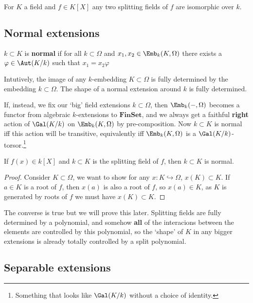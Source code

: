 \documentclass{article}
\begin{document}
\begin{corollary}
    For $K$ a field and $f\in K[X]$ any two splitting fields of $f$ are isomorphic over $k$.
\end{corollary}

\subsection{Normal extensions}

\begin{definition}
    $k\subset K$ is \textbf{normal} if for all $k\subset \Omega$ and $x_1,x_2\in\Emb_k(K,\Omega)$ there exists a $\varphi \in \Aut(K/k)$ such that $x_1=x_2\varphi$
\end{definition}

Intutively, the image of any $k$-embedding $K\subset \Omega$ is fully determined by the embedding $k\subset \Omega$. The shape of a normal extension around $k$ is fully determined.

If, instead, we fix our `big' field extensions $k\subset \Omega$, then $\Emb_k(-,\Omega)$ becomes a functor from algebraic $k$-extensions to $\textbf{FinSet}$, and we always get a faithful \textbf{right} action of $\Gal(K/k)$ on $\Emb_k(K,\Omega)$ by pre-composition. Now $k\subset K$ is normal iff this action will be transitive, equivalently iff $\Emb_k(K,\Omega)$ is a $\Gal(K/k)$-torsor.\footnote{Something that looks like $\Gal(K/k)$ without a choice of identity.}

\begin{proposition}
    If $f(x)\in k[X]$ and $k\subset K$ is the splitting field of $f$, then $k\subset K$ is normal.
    \begin{proof}
        Consider $K\subset\Omega$, we want to show for any $x:K\hookrightarrow \Omega$, $x(K)\subset K$. If $a\in K$ is a root of $f$, then $x(a)$ is also a root of $f$, so $x(a)\in K$, as $K$ is generated by roots of $f$ we must have $x(K)\subset K$.
    \end{proof}
\end{proposition}

The converse is true but we will prove this later. Splitting fields are fully determined by a polynomial, and somehow \textbf{all} of the interacions between the elements are controlled by this polynomial, so the `shape' of $K$ in any bigger extensions is already totally controlled by a split polynomial.

\subsection{Separable extensions}
\end{document}
